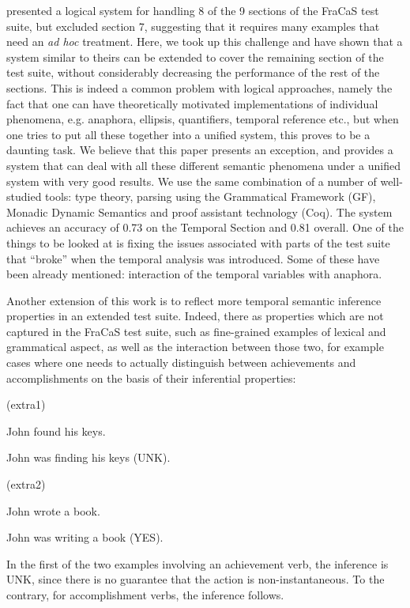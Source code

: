 \documentclass[11pt,a4paper]{article}
\newcommand\hyp{\item[H]}
\newcommand\fracasex[2]{\begin{lingex}\item[(#1)] \begin{subex} #2 \end{subex} \end{lingex} }
\begin{document}
\citet{bernardy_wide-coverage_2019} presented a
logical system for handling 8 of the 9 sections of the FraCaS test
suite, but excluded section 7, suggesting that it requires many
examples that need an \textit{ad hoc} treatment. Here, we took up this
challenge and have shown that a system similar to theirs can be extended to
cover the remaining section of the test suite, without considerably decreasing the performance of the 
rest of the sections. This is indeed a common problem with logical approaches, namely the fact that one can have theoretically motivated implementations of individual phenomena, e.g. anaphora, ellipsis, quantifiers, temporal reference etc., but when one tries to put all these together into a unified system, this proves to be a daunting task. We believe that this paper presents an exception, and provides a system that can deal with all these different semantic phenomena under a unified system with very good results. 
%
We use the same combination of a number of well-studied tools: type
theory, parsing using the Grammatical Framework (GF), Monadic Dynamic
Semantics and proof assistant technology (Coq). The system achieves an
accuracy of 0.73 on the Temporal Section and 0.81 overall.
One of the
things to be looked at is fixing the issues associated with parts of
the test suite that ``broke'' when the temporal analysis was
introduced. Some of these have been already mentioned: interaction of
the temporal variables with anaphora.

Another extension of this work is to reflect more temporal semantic
inference properties in an extended test suite. Indeed, there as properties which are
not captured in the FraCaS test suite, such as fine-grained examples of lexical and
grammatical aspect, as well as the interaction between those two, for example
cases where one needs to actually distinguish between achievements and
accomplishments on the basis of their inferential properties:

\fracasex{extra1}{
	\item	John found his keys.  
	\hyp 	John was finding his keys  (UNK).
}

\fracasex{extra2}{
	\item	John wrote a book.  
	\hyp 	John was writing a book  (YES).
}

In the first of the two examples involving an achievement verb, the
inference is UNK, since there is no guarantee that the action is
non-instantaneous. To the contrary, for accomplishment verbs, the
inference follows.
\end{document}
